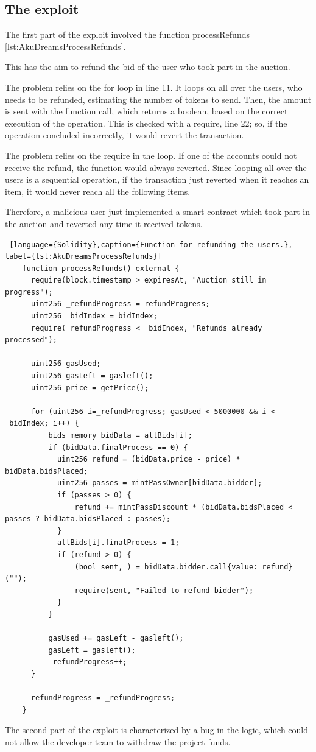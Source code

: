 \subsection{The exploit}
\label{sec:AkuDreams:AkutarsExploit}

The first part of the exploit involved the function processRefunds \autoref{lst:AkuDreamsProcessRefunds}.

This has the aim to refund the bid of the user who took part in the auction. 

The problem relies on the for loop in line 11. 
It loops on all over the users, who needs to be refunded, estimating the number of tokens to send. 
Then, the amount is sent with the function call, which returns a boolean, based on the correct execution of the operation.
This is checked with a require, line 22; so, if the operation concluded incorrectly, it would revert the transaction.

The problem relies on the require in the loop. If one of the accounts could not receive the refund, the function would always reverted.
Since looping all over the users is a sequential operation, if the transaction just reverted when it reaches an item, it would never reach all the following items. 

Therefore, a malicious user just implemented a smart contract which took part in the auction and reverted any time it received tokens.

\begin{lstlisting} [language={Solidity},caption={Function for refunding the users.}, label={lst:AkuDreamsProcessRefunds}]
    function processRefunds() external {
      require(block.timestamp > expiresAt, "Auction still in progress");
      uint256 _refundProgress = refundProgress;
      uint256 _bidIndex = bidIndex;
      require(_refundProgress < _bidIndex, "Refunds already processed");
      
      uint256 gasUsed;
      uint256 gasLeft = gasleft();
      uint256 price = getPrice();
      
      for (uint256 i=_refundProgress; gasUsed < 5000000 && i < _bidIndex; i++) {
          bids memory bidData = allBids[i];
          if (bidData.finalProcess == 0) {
            uint256 refund = (bidData.price - price) * bidData.bidsPlaced;
            uint256 passes = mintPassOwner[bidData.bidder];
            if (passes > 0) {
                refund += mintPassDiscount * (bidData.bidsPlaced < passes ? bidData.bidsPlaced : passes);
            }
            allBids[i].finalProcess = 1;
            if (refund > 0) {
                (bool sent, ) = bidData.bidder.call{value: refund}("");
                require(sent, "Failed to refund bidder");
            }
          }
          
          gasUsed += gasLeft - gasleft();
          gasLeft = gasleft();
          _refundProgress++;
      }

      refundProgress = _refundProgress;
    }
\end{lstlisting}
The second part of the exploit is characterized by a bug in the logic, which could not allow the developer team to withdraw the project funds. 

